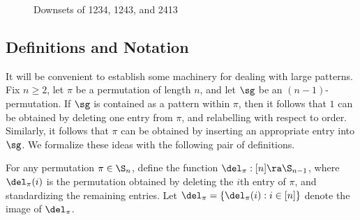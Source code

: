 \documentclass[12pt,twoside]{memoir}
\begin{document}
    \begin{figure}[t] 
      \centering
    \caption{Downsets of 1234, 1243, and 2413} \label{fixpat:fig:downsets}
    \end{figure}

  \subsection{Definitions and Notation}

    It will be convenient to establish some machinery for dealing with large
    patterns. Fix $n \geq 2$, let $\pi$ be a permutation of length $n$, and let $\sg$ be an
    $(n-1)$-permutation. If $\sg$ is contained as a pattern within $\pi$, then it
    follows that $1$ can be obtained by deleting one entry from $\pi$, and
    relabelling with respect to order. Similarly, it follows that $\pi$ can be
    obtained by inserting an appropriate entry into $\sg$. We formalize these ideas
    with the following pair of definitions. 


    \begin{definition} \label{fixpat:def:del}
      For any permutation $\pi \in \S_n$, define the function 
      $\del_\pi: [n] \ra \S_{n-1}$, where $\del_\pi(i)$ is the permutation
      obtained by deleting the $i$th entry of $\pi$, and standardizing the
      remaining entries. Let $\del_\pi = \{ \del_\pi(i) : i \in [n]\}$ denote the
      image of $\del_\pi$. 
    \end{definition}
\end{document}
